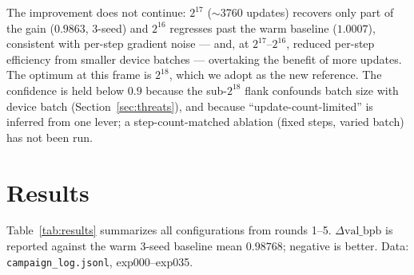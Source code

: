 \documentclass{article}
\newcommand{\valbpb}{\mathrm{val\_bpb}}
\begin{document}
The improvement does not continue: $2^{17}$ ($\sim$3760 updates) recovers only part of the gain ($0.9863$, 3-seed) and $2^{16}$ regresses past the warm baseline ($1.0007$), consistent with per-step gradient noise --- and, at $2^{17}$--$2^{16}$, reduced per-step efficiency from smaller device batches --- overtaking the benefit of more updates. The optimum at this frame is $2^{18}$, which we adopt as the new reference. The confidence is held below $0.9$ because the sub-$2^{18}$ flank confounds batch size with device batch (Section~\ref{sec:threats}), and because ``update-count-limited'' is inferred from one lever; a step-count-matched ablation (fixed steps, varied batch) has not been run.

\section{Results}
\label{sec:results}

Table~\ref{tab:results} summarizes all configurations from rounds 1--5. $\Delta\valbpb$ is reported against the warm 3-seed baseline mean $0.98768$; negative is better. Data: \texttt{campaign\_log.jsonl}, exp000--exp035.
\end{document}
